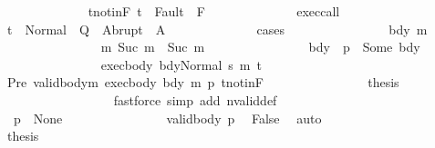\begin{isabellebody}
\ \ \ \ \ \ \ \ \ \ \ \ \isamarkupfalse%
\ t{\isacharunderscore}notin{\isacharunderscore}F{\isacharcolon}\ {\isachardoublequoteopen}t\ {\isasymnotin}\ Fault\ {\isacharbackquote}\ F{\isachardoublequoteclose}\isanewline
\ \ \ \ \ \ \ \ \ \ \ \ \isamarkupfalse%
\ exec{\isacharunderscore}call\isanewline
\ \ \ \ \ \ \ \ \ \ \ \ \isamarkupfalse%
\ {\isachardoublequoteopen}t\ {\isasymin}\ Normal\ {\isacharbackquote}\ Q\ {\isasymunion}\ Abrupt\ {\isacharbackquote}\ A{\isachardoublequoteclose}\isanewline
\ \ \ \ \ \ \ \ \ \ \ \ \isamarkupfalse%
\ {\isacharparenleft}cases{\isacharparenright}\isanewline
\ \ \ \ \ \ \ \ \ \ \ \ \ \ \isamarkupfalse%
\ bdy\ m{\isacharprime}\ \isanewline
\ \ \ \ \ \ \ \ \ \ \ \ \ \ \isamarkupfalse%
\ m{\isacharcolon}\ {\isachardoublequoteopen}Suc\ m\ {\isacharequal}\ Suc\ m{\isacharprime}{\isachardoublequoteclose}\isanewline
\ \ \ \ \ \ \ \ \ \ \ \ \ \ \isamarkupfalse%
\ bdy{\isacharcolon}\ {\isachardoublequoteopen}{\isasymGamma}\ p\ {\isacharequal}\ Some\ bdy{\isachardoublequoteclose}\isanewline
\ \ \ \ \ \ \ \ \ \ \ \ \ \ \isamarkupfalse%
\ exec{\isacharunderscore}body{\isacharcolon}\ {\isachardoublequoteopen}{\isasymGamma}{\isasymturnstile}{\isasymlangle}bdy{\isacharcomma}Normal\ s{\isasymrangle}\ {\isacharequal}m{\isacharprime}{\isasymRightarrow}\ t{\isachardoublequoteclose}\isanewline
\ \ \ \ \ \ \ \ \ \ \ \ \ \ \isamarkupfalse%
\ Pre\ valid{\isacharunderscore}body{\isacharunderscore}m\ exec{\isacharunderscore}body\ bdy\ m\ p\ t{\isacharunderscore}notin{\isacharunderscore}F\isanewline
\ \ \ \ \ \ \ \ \ \ \ \ \ \ \isamarkupfalse%
\ {\isacharquery}thesis\isanewline
\ \ \ \ \ \ \ \ \ \ \ \ \ \ \ \ \isamarkupfalse%
\ {\isacharparenleft}fastforce\ simp\ add{\isacharcolon}\ nvalid{\isacharunderscore}def{\isacharparenright}\isanewline
\ \ \ \ \ \ \ \ \ \ \ \ \isamarkupfalse%
\isanewline
\ \ \ \ \ \ \ \ \ \ \ \ \ \ \isamarkupfalse%
\ {\isachardoublequoteopen}{\isasymGamma}\ p\ {\isacharequal}\ None{\isachardoublequoteclose}\isanewline
\ \ \ \ \ \ \ \ \ \ \ \ \ \ \isamarkupfalse%
\ valid{\isacharunderscore}body\ p\ \isamarkupfalse%
\ False\ \isamarkupfalse%
\ auto\isanewline
\ \ \ \ \ \ \ \ \ \ \ \ \ \ \isamarkupfalse%
\ {\isacharquery}thesis\ \isacommand{{\isachardot}{\isachardot}}\isamarkupfalse%
\isanewline
\ \ \ \ \ \ \ \ \ \ \ \ \isamarkupfalse%

\end{isabellebody}

